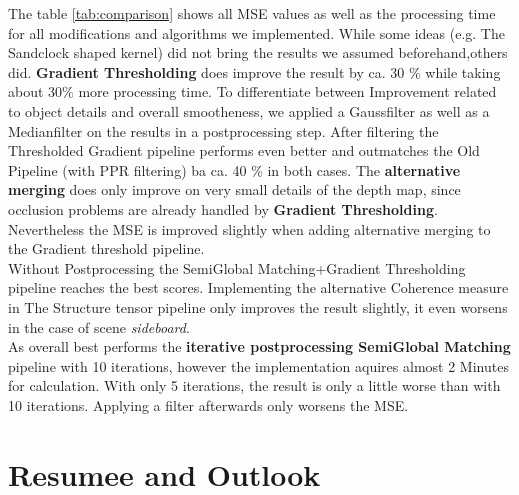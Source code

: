 \documentclass  [
  paper    = a4,
  BCOR     = 10mm,
  twoside,
  fontsize = 12pt,
  fleqn,
  toc      = bibnumbered,
  toc      = listofnumbered,
  numbers  = noendperiod,
  headings = normal,
  listof   = leveldown,
  version  = 3.03
]                                       {scrreprt}
\begin{document}
The table \ref{tab:comparison}  shows all MSE values as well as the processing time for all modifications and algorithms we implemented. While some ideas (e.g. The Sandclock shaped kernel) did not bring the results we assumed beforehand,others did. \textbf{ Gradient Thresholding} does improve the result by ca. 30 $\%$ while taking about 30$\%$ more processing time. To differentiate between Improvement related to object details and overall smootheness, we applied a Gaussfilter as well as a Medianfilter on the results in a postprocessing step. After filtering the Thresholded Gradient pipeline performs even better and outmatches the Old Pipeline (with PPR filtering) ba ca. 40 $\%$ in both cases. The \textbf{alternative merging} does only improve on very small details of the depth map, since occlusion problems are already handled by \textbf{ Gradient Thresholding}. Nevertheless the MSE is improved slightly when adding alternative merging to the Gradient threshold pipeline.\\
Without Postprocessing the SemiGlobal Matching+Gradient Thresholding pipeline reaches the best scores. Implementing the alternative Coherence measure in The Structure tensor pipeline only improves the result slightly, it even worsens in the case of scene \textit{sideboard}.\\
As overall best performs the \textbf{iterative postprocessing SemiGlobal Matching} pipeline with 10 iterations, however the implementation aquires almost 2 Minutes for calculation. With only 5 iterations, the result is only a little worse than with 10 iterations. Applying a filter afterwards only worsens the MSE.

\chapter{Resumee and Outlook}
\end{document}
